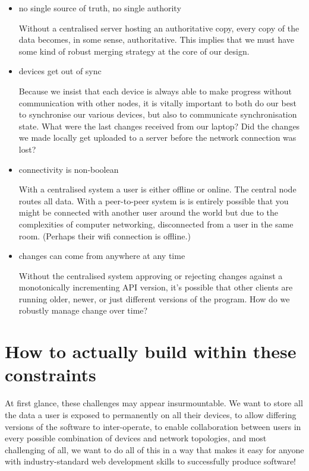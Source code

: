\documentclass[sigplan,10pt]{acmart}
\begin{document}
\begin{itemize}
	\item no single source of truth, no single authority

	Without a centralised server hosting an authoritative copy, every copy of the data becomes, in some sense, authoritative. This implies that we must have some kind of robust merging strategy at the core of our design.
	\item devices get out of sync

    Because we insist that each device is always able to make progress without communication with other nodes, it is vitally important to both do our best to synchronise our various devices, but also to communicate synchronisation state. What were the last changes received from our laptop? Did the changes we made locally get uploaded to a server before the network connection was lost?  

    \item connectivity is non-boolean

    With a centralised system a user is either offline or online. The central node routes all data. With a peer-to-peer system is is entirely possible that you might be connected with another user around the world but due to the complexities of computer networking, disconnected from a user in the same room. (Perhaps their wifi connection is offline.) 

    \item changes can come from anywhere at any time

    Without the centralised system approving or rejecting changes against a monotonically incrementing API version, it's possible that other clients are running older, newer, or just different versions of the program. How do we robustly manage change over time?
\end{itemize}

\section{How to actually build within these constraints}

At first glance, these challenges may appear insurmountable. We want to store all the data a user is exposed to permanently on all their devices, to allow differing versions of the software to inter-operate, to enable collaboration between users in every possible combination of devices and network topologies, and most challenging of all, we want to do all of this in a way that makes it easy for anyone with industry-standard web development skills to successfully produce software!
\end{document}
